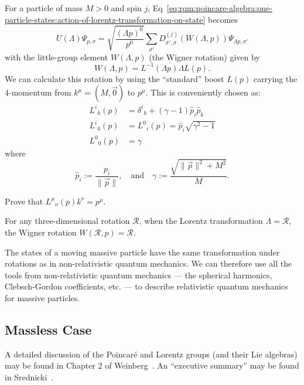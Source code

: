 \M
For a particle of mass $M>0$ and spin $j$, Eq~\eqref{eq:rqm:poincare-algebra:one-particle-states:action-of-lorentz-transformation-on-state}
becomes
\begin{equation}
U(\Lambda)\Psi_{p,\sigma}
=\sqrt{\frac{(\Lambda p)^{0}}{p^{0}}}\sum_{\sigma'}D^{(j)}_{\sigma',\sigma}(W(\Lambda,p))
\Psi_{\Lambda p,\sigma'}
\end{equation}
with the little-group element $W(\Lambda, p)$ (the Wigner rotation)
given by
\begin{equation*}
W(\Lambda, p) = L^{-1}(\Lambda p)\Lambda L(p).
\end{equation*}
We can calculate this rotation by using the ``standard'' boost $L(p)$
carrying the 4-momentum from $k^{\mu}=(M,\vec{0})$ to $p^{\mu}$. This is
conveniently chosen as:
\begin{subequations}
\begin{align}
{L^{i}}_{k}(p) &= {\delta^{i}}_{k} + (\gamma - 1)\widehat{p}_{i}\widehat{p}_{k}\\
{L^{i}}_{0}(p) &= {L^{0}}_{i}(p) = \widehat{p}_{i}\sqrt{\gamma^{2}-1}\\
{L^{0}}_{0}(p) &= \gamma
\end{align}
\end{subequations}
where
\begin{equation}
\widehat{p}_{i}:=\frac{p_{i}}{\|\vec{p}\|},\quad\mbox{and}\quad
\gamma:=\frac{\sqrt{\|\vec{p}\|^{2}+M^{2}}}{M}.
\end{equation}

\begin{exercise}
Prove that ${L^{\mu}}_{\nu}(p)k^{\nu}=p^{\mu}$.
\end{exercise}

\begin{proposition}
For any three-dimensional rotation $\mathcal{R}$, when the Lorentz
transformation $\Lambda=\mathcal{R}$, the Wigner rotation $W(\mathcal{R},p)=\mathcal{R}$.
\end{proposition}

The states of a moving massive particle have the same transformation
under rotations as in non-relativistic quantum mechanics. We can
therefore use all the tools from non-relativistic quantum mechanics ---
the spherical harmonics, Clebsch-Gordon coefficients, etc. --- to
describe relativistic quantum mechanics for massive particles.

\subsection*{Massless Case}

A detailed discussion of the Poincar\'e and Lorentz groups (and their
Lie algebras) may be found in Chapter 2 of
Weinberg~\cite{Weinberg:1995mt}.
An ``executive summary'' may be found in Srednicki~\cite{Srednicki:2007qs}.

